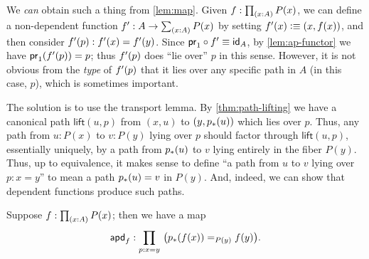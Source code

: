 \begin{center}
\end{center}

We \emph{can} obtain such a thing from \cref{lem:map}.
Given $f:\prd{x:A} P(x)$, we can define a non-dependent function $f':A\to \sm{x:A} P(x)$ by setting $f'(x)\defeq (x,f(x))$, and then consider $\ap{f'}{p} : f'(x) = f'(y)$.
Since $\proj1 \circ f' \jdeq \idfunc[A]$, by \cref{lem:ap-functor} we have $\ap{\proj1}{\ap{f'}{p}} = p$; thus $\ap{f'}{p}$ does ``lie over'' $p$ in this sense.
However, it is not obvious from the \emph{type} of $\ap{f'}{p}$ that it lies over any specific path in $A$ (in this case, $p$), which is sometimes important.

The solution is to use the transport lemma.
By \cref{thm:path-lifting} we have a canonical path $\mathsf{lift}(u,p)$ from $(x,u)$ to $(y,\trans p u)$ which lies over $p$.
Thus, any path from $u:P(x)$ to $v:P(y)$ lying over $p$ should factor through $\mathsf{lift}(u,p)$, essentially uniquely, by a path from $\trans p u$ to $v$ lying entirely in the fiber $P(y)$.
Thus, up to equivalence, it makes sense to define ``a path from $u$ to $v$ lying over $p:x=y$'' to mean a path $\trans p u = v$ in $P(y)$.
And, indeed, we can show that dependent functions produce such paths.

\begin{lem}
    \label{lem:mapdep}
    Suppose $f:\prd{x: A} P(x)$; then we have a map
    \[\apdfunc f : \prd{p:x=y}\big(\id[P(y)]{\trans p{f(x)}}{f(y)}\big).\]
\end{lem}

